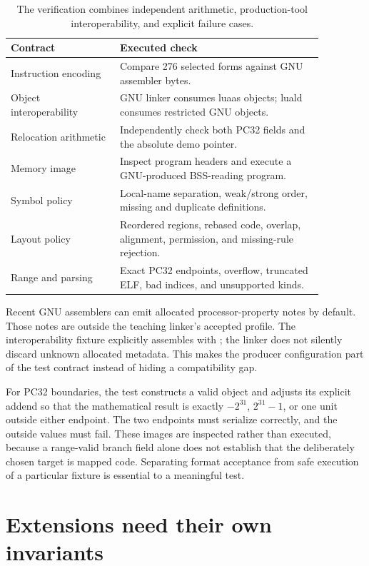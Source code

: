 \begin{table}[htbp]
\caption{The verification combines independent arithmetic, production-tool interoperability, and explicit failure cases.}
\label{tab:ch60-tests}
\centering
\begin{tabular}{p{0.30\linewidth}p{0.57\linewidth}}
\toprule
Contract & Executed check \\
\midrule
Instruction encoding & Compare 276 selected forms against GNU assembler bytes. \\
Object interoperability & GNU linker consumes luaas objects; luald consumes restricted GNU objects. \\
Relocation arithmetic & Independently check both PC32 fields and the absolute demo pointer. \\
Memory image & Inspect program headers and execute a GNU-produced BSS-reading program. \\
Symbol policy & Local-name separation, weak/strong order, missing and duplicate definitions. \\
Layout policy & Reordered regions, rebased code, overlap, alignment, permission, and missing-rule rejection. \\
Range and parsing & Exact PC32 endpoints, overflow, truncated ELF, bad indices, and unsupported kinds. \\
\bottomrule
\end{tabular}
\end{table}

Recent GNU assemblers can emit allocated processor-property notes by default.
Those notes are outside the teaching linker's accepted profile.
The interoperability fixture explicitly assembles with ; the linker does not silently discard unknown allocated metadata.
This makes the producer configuration part of the test contract instead of hiding a compatibility gap.

For PC32 boundaries, the test constructs a valid object and adjusts its explicit addend so that the mathematical result is exactly $-2^{31}$, $2^{31}-1$, or one unit outside either endpoint.
The two endpoints must serialize correctly, and the outside values must fail.
These images are inspected rather than executed, because a range-valid branch field alone does not establish that the deliberately chosen target is mapped code.
Separating format acceptance from safe execution of a particular fixture is essential to a meaningful test.

\section{Extensions need their own invariants}
\label{sec:ch60-extensions}

